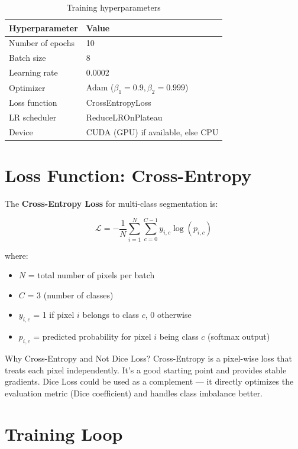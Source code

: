 \documentclass[12pt,a4paper]{report}
\begin{document}
\begin{table}[H]
\centering
\begin{tabular}{ll}
\toprule
\textbf{Hyperparameter} & \textbf{Value} \\
\midrule
Number of epochs & 10 \\
Batch size & 8 \\
Learning rate & 0.0002 \\
Optimizer & Adam ($\beta_1=0.9, \beta_2=0.999$) \\
Loss function & CrossEntropyLoss \\
LR scheduler & ReduceLROnPlateau \\
Device & CUDA (GPU) if available, else CPU \\
\bottomrule
\end{tabular}
\caption{Training hyperparameters}
\end{table}

\section{Loss Function: Cross-Entropy}

The \textbf{Cross-Entropy Loss} for multi-class segmentation is:

$$\mathcal{L} = -\frac{1}{N} \sum_{i=1}^{N} \sum_{c=0}^{C-1} y_{i,c} \log(p_{i,c})$$

where:
\begin{itemize}
    \item $N$ = total number of pixels per batch
    \item $C$ = 3 (number of classes)
    \item $y_{i,c}$ = 1 if pixel $i$ belongs to class $c$, 0 otherwise
    \item $p_{i,c}$ = predicted probability for pixel $i$ being class $c$ (softmax output)
\end{itemize}

\begin{conceptbox}{Why Cross-Entropy and Not Dice Loss?}
Cross-Entropy is a pixel-wise loss that treats each pixel independently. It's a good starting point and provides stable gradients. Dice Loss could be used as a complement --- it directly optimizes the evaluation metric (Dice coefficient) and handles class imbalance better.
\end{conceptbox}

\section{Training Loop}
\end{document}
